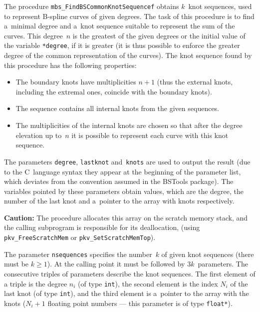 \vspace{\bigskipamount}
The procedure \texttt{mbs\_FindBSCommonKnotSequencef} obtains $k$~knot
sequences, used to represent B-spline curves of given degrees.
The task of this procedure is to find a~minimal degree and a~knot sequence
suitable to represent the sum of the curves. This degree~$n$ is the greatest
of the given degrees or the initial value of the variable \texttt{*degree},
if it is greater (it is thus possible to enforce the greater degree of the
common representation of the curves). The knot sequence found by this
procedure has the following properties:
\begin{itemize}
\item The boundary knots have multiplicities $n+1$ (thus the external
  knots, including the extremal ones, coincide with the boundary knots).
\item The sequence contains all internal knots from the given sequences.
\item The multiplicities of the internal knots are chosen so that
  after the degree elevation up to~$n$ it is possible to represent each
  curve with this knot sequence.
\end{itemize}

The parameters \texttt{degree}, \texttt{lastknot} and~\texttt{knots} are
used to output the result (due to the C~language syntax they appear at
the beginning of the parameter list, which deviates from the convention
assumed in the BSTools package).
The variables pointed by these parameters obtain values, which are
the degree, the number of the last knot and a~pointer to the array with
knots respectively.

\vspace{\medskipamount}
\begin{sloppypar}
\noindent
\textbf{Caution:} The procedure allocates this array on the scratch memory
stack, and the calling subprogram is responsible for its deallocation,
(using \texttt{pkv\_FreeScratchMem} or \texttt{pkv\_SetScratchMemTop}).%
\end{sloppypar}

\vspace{\medskipamount}
The parameter \texttt{nsequences} specifies the number~$k$ of given knot
sequences (there must be $k\geq 1$). At the calling point it must be followed
by $3k$~parameters. The consecutive triples of parameters describe the knot
sequences. The first element of a triple is the degree $n_i$
(of type \texttt{int}), the second element is the index $N_i$ of the last
knot (of type \texttt{int}), and the third element is a~pointer to the array
with the knots ($N_i+1$ floating point numbers --- this parameter is of type
\texttt{float*}).

